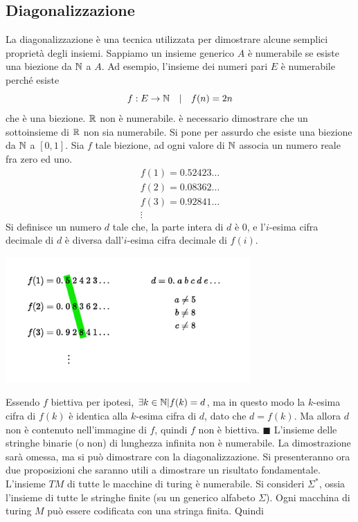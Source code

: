 \documentclass[10pt, letterpaper]{report}
\begin{document}
\subsection{Diagonalizzazione}
La diagonalizzazione è una tecnica utilizzata per dimostrare alcune semplici proprietà degli insiemi. Sappiamo un insieme generico $A$ è numerabile se esiste una biezione da ${\mathbb N}$ a $A$. Ad esempio, l'insieme dei numeri pari $E$ è numerabile perché esiste $$ f:E\rightarrow {\mathbb N}\ \ \ | \ \ \  f(n)=2n$$ che è una biezione.\acc 
\teo{} ${\mathbb R}$ non è numerabile.\acc 
\dimo{} è necessario dimostrare che un sottoinsieme di ${\mathbb R}$ non sia numerabile. Si pone per assurdo che esiste una biezione da ${\mathbb N}$ a $[0,1]$. Sia $f$ tale biezione, ad ogni valore di ${\mathbb N}$ associa un numero reale fra zero ed uno.$$ \begin{matrix}
    f(1)=0.52423\dots\\ 
    f(2)=0.08362\dots\\ 
    f(3)=0.92841\dots\\ \vdots
\end{matrix}$$
Si definisce un numero $d$ tale che, la parte intera di $d$ è 0, e l'$i$-esima cifra decimale di $d$ è diversa dall'$i$-esima cifra decimale di $f(i)$.\begin{center}
    \includegraphics[width=0.7\textwidth ]{images/realiNonNumerabili..pdf}
\end{center}
Essendo $f$ biettiva per ipotesi, $\exists k \in {\mathbb N} | f(k)=d$, ma in questo modo la $k$-esima cifra di $f(k)$ è identica alla $k$-esima cifra di $d$, dato che $d=f(k)$. Ma allora $d$ non è contenuto nell'immagine di $f$, quindi $f$ non è biettiva. \hfill$\blacksquare$\acc 
\prop{} L'insieme delle stringhe binarie (o non) di lunghezza infinita non è numerabile.\acc 
La dimostrazione sarà omessa, ma si può dimostrare con la diagonalizzazione. Si presenteranno ora due proposizioni che saranno utili a dimostrare un risultato fondamentale.\acc 
{} L'insieme $TM$ di tutte le macchine di turing è numerabile.\acc 
{} Si consideri $\Sigma^*$, ossia l'insieme di tutte le stringhe finite (su un generico alfabeto $\Sigma$). Ogni macchina di turing $M$ può essere codificata con una stringa finita. Quindi 
\end{document}
